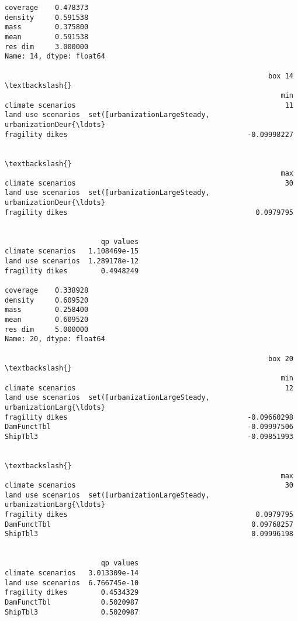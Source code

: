 \documentclass{article}
\begin{document}
    \begin{Verbatim}[commandchars=\\\{\}]
coverage    0.478373
density     0.591538
mass        0.375800
mean        0.591538
res dim     3.000000
Name: 14, dtype: float64

                                                               box 14  \textbackslash{}
                                                                  min   
climate scenarios                                                  11   
land use scenarios  set([urbanizationLargeSteady, urbanizationDeur{\ldots}   
fragility dikes                                           -0.09998227   

                                                                       \textbackslash{}
                                                                  max   
climate scenarios                                                  30   
land use scenarios  set([urbanizationLargeSteady, urbanizationDeur{\ldots}   
fragility dikes                                             0.0979795   

                                  
                       qp values  
climate scenarios   1.108469e-15  
land use scenarios  1.289178e-12  
fragility dikes        0.4948249  

coverage    0.338928
density     0.609520
mass        0.258400
mean        0.609520
res dim     5.000000
Name: 20, dtype: float64

                                                               box 20  \textbackslash{}
                                                                  min   
climate scenarios                                                  12   
land use scenarios  set([urbanizationLargeSteady, urbanizationLarg{\ldots}   
fragility dikes                                           -0.09660298   
DamFunctTbl                                               -0.09997506   
ShipTbl3                                                  -0.09851993   

                                                                       \textbackslash{}
                                                                  max   
climate scenarios                                                  30   
land use scenarios  set([urbanizationLargeSteady, urbanizationLarg{\ldots}   
fragility dikes                                             0.0979795   
DamFunctTbl                                                0.09768257   
ShipTbl3                                                   0.09996198   

                                  
                       qp values  
climate scenarios   3.013309e-14  
land use scenarios  6.766745e-10  
fragility dikes        0.4534329  
DamFunctTbl            0.5020987  
ShipTbl3               0.5020987
    \end{Verbatim}
\end{document}
